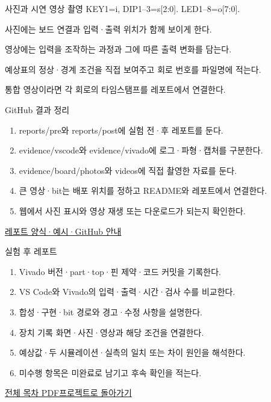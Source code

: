 \begin{frame}{사진과 시연 영상 촬영}\relax
\small
KEY1=i, DIP1–3=s[2:0]. LED1–8=o[7:0].\par\vspace{0.22cm}사진에는 보드 연결과 입력·출력 위치가 함께 보이게 한다.\par\vspace{0.22cm}영상에는 입력을 조작하는 과정과 그에 따른 출력 변화를 담는다.\par\vspace{0.22cm}예상표의 정상·경계 조건을 직접 보여주고 회로 번호를 파일명에 적는다.\par\vspace{0.22cm}통합 영상이라면 각 회로의 타임스탬프를 레포트에서 연결한다.\par
\end{frame}

\begin{frame}{GitHub 결과 정리}\relax
\small
\begin{enumerate}\setlength{\itemsep}{0.22cm}
\item reports/pre와 reports/post에 실험 전·후 레포트를 둔다.
\item evidence/vscode와 evidence/vivado에 로그·파형·캡처를 구분한다.
\item evidence/board/photos와 videos에 직접 촬영한 자료를 둔다.
\item 큰 영상·bit는 배포 위치를 정하고 README와 레포트에서 연결한다.
\item 웹에서 사진 표시와 영상 재생 또는 다운로드가 되는지 확인한다.
\end{enumerate}
\href{https://github.com/Glaysia/ece2_26_2_2/blob/daily/0910/example/fpga_projects_hdl/LAB1/docs/reports.md}{레포트 양식·예시·GitHub 안내}
\end{frame}

\begin{frame}{실험 후 레포트}\relax
\small
\begin{enumerate}\setlength{\itemsep}{0.22cm}
\item Vivado 버전·part·top·핀 제약·코드 커밋을 기록한다.
\item VS Code와 Vivado의 입력·출력·시간·검사 수를 비교한다.
\item 합성·구현·bit 경로와 경고·수정 사항을 설명한다.
\item 장치 기록 화면·사진·영상과 해당 조건을 연결한다.
\item 예상값·두 시뮬레이션·실측의 일치 또는 차이 원인을 해석한다.
\item 미수행 항목은 미완료로 남기고 후속 확인을 적는다.
\end{enumerate}
\href{04.LAB1_00_CONTENTS.pdf}{전체 목차 PDF}\quad\href{https://github.com/Glaysia/fpga-lab-example-legacy-07-demux1to8/tree/2e2ab8cf96476f44e9357cc4aa48570b7e18b613}{프로젝트로 돌아가기}
\end{frame}
\endgroup

